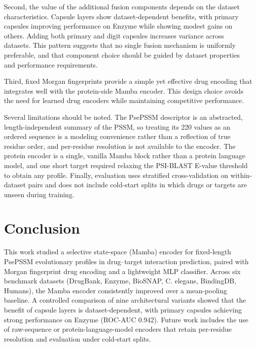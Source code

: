 \documentclass[conference]{IEEEtran}
\begin{document}
Second, the value of the additional fusion components depends on the dataset characteristics. Capsule layers show dataset-dependent benefits, with primary capsules improving performance on Enzyme while showing modest gains on others. Adding both primary and digit capsules increases variance across datasets. This pattern suggests that no single fusion mechanism is uniformly preferable, and that component choice should be guided by dataset properties and performance requirements.

Third, fixed Morgan fingerprints provide a simple yet effective drug encoding
that integrates well with the protein-side Mamba encoder. This design choice
avoids the need for learned drug encoders while maintaining competitive
performance.

Several limitations should be noted. The PsePSSM descriptor is an abstracted,
length-independent summary of the PSSM, so treating its 220 values as an ordered
sequence is a modeling convenience rather than a reflection of true residue
order, and per-residue resolution is not available to the encoder. The protein
encoder is a single, vanilla Mamba block rather than a protein language model,
and one short target required relaxing the PSI-BLAST E-value threshold to obtain
any profile. Finally, evaluation uses stratified
cross-validation on within-dataset pairs and does not include cold-start splits
in which drugs or targets are unseen during training.

\section{Conclusion}
This work studied a selective state-space (Mamba) encoder for fixed-length
PsePSSM evolutionary profiles in drug--target interaction prediction, paired with
Morgan fingerprint drug encoding and a lightweight MLP classifier. Across six benchmark
datasets (DrugBank, Enzyme, BioSNAP, C. elegans, BindingDB, Humans), the Mamba encoder
consistently improved over a mean-pooling baseline. A controlled comparison of nine
architectural variants showed that the benefit of capsule layers is dataset-dependent,
with primary capsules achieving strong performance on Enzyme (ROC-AUC 0.942). Future work
includes the use of raw-sequence or protein-language-model encoders that retain per-residue
resolution and evaluation under cold-start splits.
\end{document}
